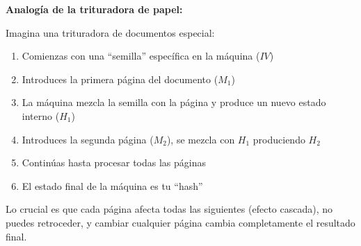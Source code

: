 \documentclass[11pt,a4paper,twoside,openright]{book}
\theoremstyle{definition}
\theoremstyle{plain}
\theoremstyle{remark}
\begin{document}
\begin{center}
\end{center}

\begin{intuicion}
\textbf{Analogía de la trituradora de papel:}

Imagina una trituradora de documentos especial:
\begin{enumerate}
    \item Comienzas con una ``semilla'' específica en la máquina ($IV$)
    \item Introduces la primera página del documento ($M_1$)
    \item La máquina mezcla la semilla con la página y produce un nuevo estado interno ($H_1$)
    \item Introduces la segunda página ($M_2$), se mezcla con $H_1$ produciendo $H_2$
    \item Continúas hasta procesar todas las páginas
    \item El estado final de la máquina es tu ``hash''
\end{enumerate}

Lo crucial es que cada página afecta todas las siguientes (efecto cascada), no puedes retroceder, y cambiar cualquier página cambia completamente el resultado final.
\end{intuicion}
\end{document}
